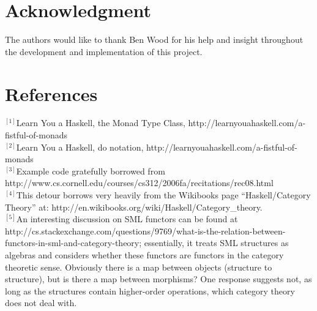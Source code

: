 \documentclass[journal]{IEEEtran}
\begin{document}

%


\section*{Acknowledgment}


The authors would like to thank Ben Wood for his  help and insight throughout the development and implementation of this project. 


\section*{References}
\raggedright
$^{[1]}$Learn You a Haskell, the Monad Type Class, http://learnyouahaskell.com/a-fistful-of-monads\\
$^{[2]}$Learn You a Haskell, do notation, http://learnyouahaskell.com/a-fistful-of-monads\\
$^{[3]}$Example code gratefully borrowed from http://www.cs.cornell.edu/courses/cs312/2006fa/recitations/rec08.html\\
$^{[4]}$This detour borrows very heavily from the Wikibooks page “Haskell/Category Theory” at: http://en.wikibooks.org/wiki/Haskell/Category\_theory.\\
$^{[5]}$An interesting discussion on SML functors can be found at http://cs.stackexchange.com/questions/9769/what-is-the-relation-between-functors-in-sml-and-category-theory; essentially, it treats SML structures as algebras and considers whether these functors are functors in the category theoretic sense. Obviously there is a map between objects (structure to structure), but is there a map between morphisms? One response suggests not, as long as the structures contain higher-order operations, which category theory does not deal with.\\
\end{document}
